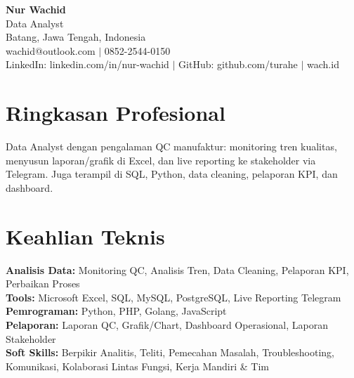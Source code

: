 \begin{center}
  {\LARGE\bfseries Nur Wachid}\\[3pt]
  Data Analyst\\[2pt]
  Batang, Jawa Tengah, Indonesia\\[2pt]
  wachid@outlook.com $|$ 0852-2544-0150\\[1pt]
  LinkedIn: linkedin.com/in/nur-wachid $|$ GitHub: github.com/turahe $|$ wach.id
\end{center}
\section*{Ringkasan Profesional}
Data Analyst dengan pengalaman QC manufaktur: monitoring tren kualitas, menyusun laporan/grafik di Excel, dan live reporting ke stakeholder via Telegram. Juga terampil di SQL, Python, data cleaning, pelaporan KPI, dan dashboard.
\section*{Keahlian Teknis}
\textbf{Analisis Data:} Monitoring QC, Analisis Tren, Data Cleaning, Pelaporan KPI, Perbaikan Proses\\[1pt]
\textbf{Tools:} Microsoft Excel, SQL, MySQL, PostgreSQL, Live Reporting Telegram\\[1pt]
\textbf{Pemrograman:} Python, PHP, Golang, JavaScript\\[1pt]
\textbf{Pelaporan:} Laporan QC, Grafik/Chart, Dashboard Operasional, Laporan Stakeholder\\[1pt]
\textbf{Soft Skills:} Berpikir Analitis, Teliti, Pemecahan Masalah, Troubleshooting, Komunikasi, Kolaborasi Lintas Fungsi, Kerja Mandiri \& Tim
